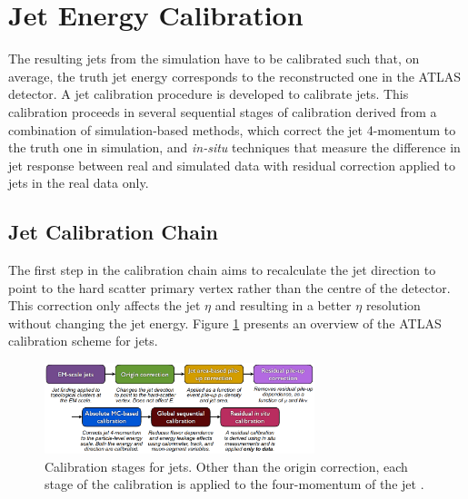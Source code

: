 \section{Jet Energy Calibration}
\label{Jet:Cal}
The resulting jets from the simulation have to be calibrated such that, on average, the truth jet energy corresponds to the reconstructed one in the ATLAS detector. A jet calibration procedure is developed to calibrate jets. This calibration proceeds in several sequential stages of calibration derived from a combination of simulation-based methods, which correct the jet 4-momentum to the truth one in simulation, and \textit{in-situ} techniques that measure the difference in jet response between real and simulated data with residual correction applied to jets in the real data only.

\subsection{Jet Calibration Chain}
\label{Jet:Cal:chain}
The first step in the calibration chain aims to recalculate the jet direction to point to the hard scatter primary vertex rather than the centre of the detector. This correction only affects the jet $\eta$ and resulting in a better $\eta$ resolution without changing the jet energy. Figure \ref{fig:Jet:Cal:chain} presents an overview of the ATLAS calibration scheme for jets.
\begin{figure}[htbp]
     \centering
     \includegraphics[width=0.7\textwidth]{Ch4/Img/calibration_chain.png}
     \caption{Calibration stages for jets. Other than the origin correction, each stage of the calibration is applied to the four-momentum of the jet \cite{JES_Sys_13_TeV}.}
     \label{fig:Jet:Cal:chain}
 \end{figure}

